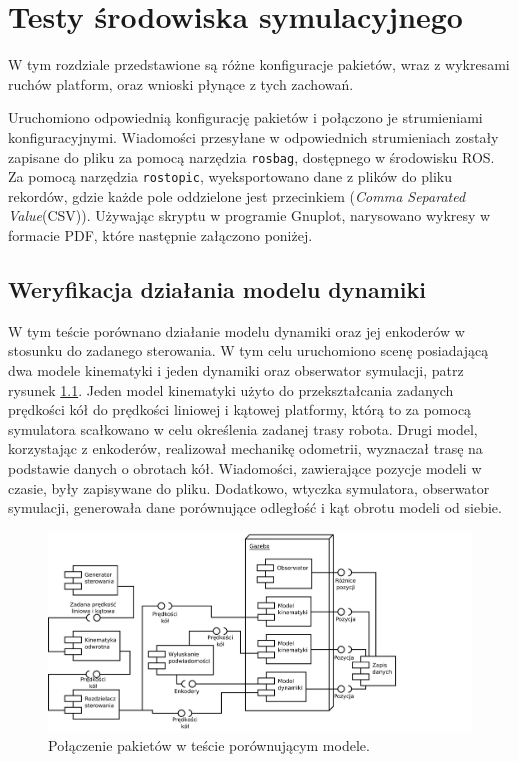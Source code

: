 \chapter{Testy środowiska symulacyjnego}
\label{sec:tests}
W tym rozdziale przedstawione są różne konfiguracje pakietów, wraz z wykresami ruchów platform, oraz wnioski płynące z tych zachowań.

Uruchomiono odpowiednią konfigurację pakietów i połączono je strumieniami konfiguracyjnymi.
Wiadomości przesyłane w odpowiednich strumieniach zostały zapisane do pliku za pomocą narzędzia
\texttt{rosbag}, dostępnego w środowisku ROS.
Za pomocą narzędzia \texttt{rostopic}, wyeksportowano dane z plików do pliku rekordów, gdzie każde pole oddzielone jest przecinkiem (\emph{Comma Separated Value}(CSV)).
Używając skryptu w programie Gnuplot, narysowano wykresy w formacie PDF, które następnie załączono poniżej.

\section{Weryfikacja działania modelu dynamiki}
	W tym teście porównano działanie modelu dynamiki oraz jej enkoderów w stosunku do zadanego sterowania.
	W tym celu uruchomiono scenę posiadającą dwa modele kinematyki i jeden dynamiki oraz obserwator symulacji, patrz rysunek \ref{uml:comparison}.
	Jeden model kinematyki użyto do przekształcania zadanych prędkości kół do prędkości liniowej i kątowej platformy, którą to za pomocą symulatora scałkowano w celu określenia zadanej trasy robota. Drugi model, korzystając z enkoderów, realizował mechanikę odometrii, wyznaczał trasę na podstawie danych o obrotach kół.
	Wiadomości, zawierające pozycje modeli w czasie, były zapisywane do pliku.
	Dodatkowo, wtyczka symulatora, obserwator symulacji, generowała dane porównujące odległość i kąt obrotu modeli od siebie.
	
	\begin{figure}[h]
		\centering
		\includegraphics[width=\textwidth]{uml/comparison.pdf}
			\caption{Połączenie pakietów w teście porównującym modele.}
		\label{uml:comparison}
	\end{figure}
	
